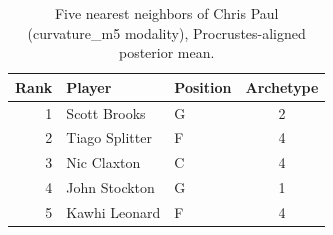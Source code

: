 \begin{table}[htbp]
  \centering\small
  \begin{tabular}{rllc}
    \toprule
    Rank & Player & Position & Archetype \\
    \midrule
    1 & Scott Brooks & G & 2 \\
    2 & Tiago Splitter & F & 4 \\
    3 & Nic Claxton & C & 4 \\
    4 & John Stockton & G & 1 \\
    5 & Kawhi Leonard & F & 4 \\
    \bottomrule
  \end{tabular}
  \caption{Five nearest neighbors of Chris Paul (curvature_m5 modality), Procrustes-aligned posterior mean.}
  \label{tab:Chris_Paul_neighbors_curvature_m5}
\end{table}

